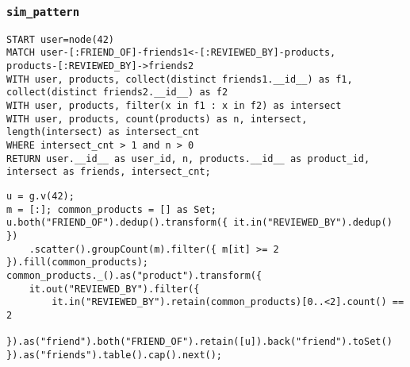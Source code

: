 \subsubsection*{\texttt{sim\_pattern}}

\begin{lstlisting}
START user=node(42)
MATCH user-[:FRIEND_OF]-friends1<-[:REVIEWED_BY]-products,
products-[:REVIEWED_BY]->friends2
WITH user, products, collect(distinct friends1.__id__) as f1, collect(distinct friends2.__id__) as f2
WITH user, products, filter(x in f1 : x in f2) as intersect
WITH user, products, count(products) as n, intersect, length(intersect) as intersect_cnt
WHERE intersect_cnt > 1 and n > 0
RETURN user.__id__ as user_id, n, products.__id__ as product_id, intersect as friends, intersect_cnt;
\end{lstlisting}

\begin{lstlisting}
u = g.v(42);
m = [:]; common_products = [] as Set;
u.both("FRIEND_OF").dedup().transform({ it.in("REVIEWED_BY").dedup() })
	.scatter().groupCount(m).filter({ m[it] >= 2 }).fill(common_products);
common_products._().as("product").transform({
	it.out("REVIEWED_BY").filter({
		it.in("REVIEWED_BY").retain(common_products)[0..<2].count() == 2
	}).as("friend").both("FRIEND_OF").retain([u]).back("friend").toSet()
}).as("friends").table().cap().next();
\end{lstlisting}



